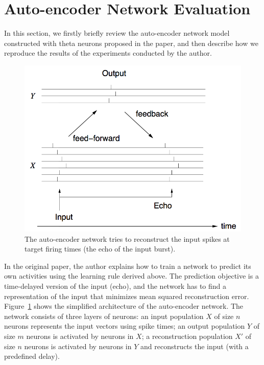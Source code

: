 \section{Auto-encoder Network Evaluation}
\label{exp}

In this section, we firstly briefly review the auto-encoder network model constructed with theta neurons
proposed in the paper, and then describe how we reproduce the results of the experiments conducted by the author.

\begin{figure}
\centering
\includegraphics[width=0.98\columnwidth]{network}
\caption{The auto-encoder network tries to reconstruct the input spikes at target firing times (the echo of the input burst).
}
\label{auto_encoder}
\end{figure}

In the original paper, the author explains how to train a network to predict its own activities using the learning rule derived above. 
The prediction objective is a time-delayed version of the input (echo), 
and the network has to find a representation of the input that minimizes mean squared reconstruction error.
Figure~\ref{auto_encoder} shows the simplified architecture of the auto-encoder network.
The network consists of three layers of neurons: 
an input population $X$ of size $n$ neurons represents the input vectors using spike times; 
an output population $Y$ of size $m$ neurons is activated by neurons in $X$; 
a reconstruction population $X'$ of size $n$ neurons is activated by neurons in $Y$ and reconstructs the input (with a predefined delay).

